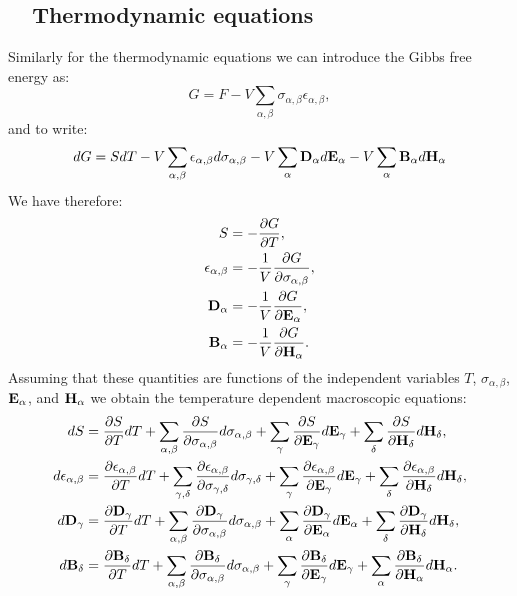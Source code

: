 \documentclass[12pt,a4paper,twoside]{report}
\begin{document}
\subsection{\ \ Thermodynamic equations}
Similarly for the thermodynamic equations we can introduce the Gibbs
free energy as:
\begin{equation}
G=F - V \sum_{\alpha,\beta} \sigma_{\alpha,\beta} \epsilon_{\alpha,\beta},
\end{equation}
and to write:
\begin{equation}
dG=SdT - V \sum_{\alpha,\beta} \epsilon_{\alpha,\beta} d \sigma_{\alpha,\beta}
-V \sum_{\alpha} {\bf D}_\alpha d {\bf E}_\alpha
-V \sum_{\alpha} {\bf B}_\alpha d {\bf H}_\alpha
\end{equation}
We have therefore:
\begin{align}
S&= -{\partial G \over \partial T}, \\
\epsilon_{\alpha,\beta}&= -{1\over V}
{\partial G \over \partial \sigma_{\alpha,\beta}}, \\
{\bf D}_{\alpha}&= -{1\over V}
{\partial G \over \partial {\bf E}_{\alpha}}, \\
{\bf B}_{\alpha}&= -{1\over V}
{\partial G \over \partial {\bf H}_{\alpha}}.
\end{align}
Assuming that these quantities are functions of the independent variables
$T$, $\sigma_{\alpha,\beta}$, ${\bf E}_\alpha$, and ${\bf H}_\alpha$ we
obtain the temperature dependent macroscopic equations:
\begin{align}
dS&= {\partial S \over \partial T} dT+\sum_{\alpha,\beta}
{\partial S \over \partial \sigma_{\alpha,\beta}}d\sigma_{\alpha,\beta}
+\sum_\gamma{\partial S \over \partial {\bf E}_{\gamma}}d{\bf E}_{\gamma}+ 
\sum_\delta{\partial S \over \partial {\bf H}_{\delta}}d{\bf H}_{\delta}, \\
d\epsilon_{\alpha,\beta}&=
{\partial \epsilon_{\alpha,\beta} \over \partial T} dT+\sum_{\gamma,\delta}
{\partial \epsilon_{\alpha,\beta} \over \partial 
\sigma_{\gamma,\delta}}d\sigma_{\gamma,\delta}
+\sum_\gamma{\partial \epsilon_{\alpha,\beta} \over \partial 
{\bf E}_{\gamma}}d{\bf E}_{\gamma}+ 
\sum_\delta{\partial \epsilon_{\alpha,\beta} \over \partial 
{\bf H}_{\delta}}d{\bf H}_{\delta}, \\
d{\bf D}_\gamma&=
{\partial  {\bf D}_\gamma \over \partial T} dT+\sum_{\alpha,\beta}
{\partial {\bf D}_\gamma \over \partial \sigma_{\alpha,\beta}}
d\sigma_{\alpha,\beta}
+\sum_\alpha{\partial {\bf D}_\gamma \over \partial {\bf E}_{\alpha}}d{\bf E}_{\alpha}+ 
\sum_\delta{\partial {\bf D}_\gamma \over \partial {\bf H}_{\delta}}d{\bf H}_{\delta}, \\
d{\bf B}_\delta&=
{\partial {\bf B}_\delta \over \partial T} dT+\sum_{\alpha,\beta}
{\partial {\bf B}_\delta \over \partial \sigma_{\alpha,\beta}}
d\sigma_{\alpha,\beta}
+\sum_\gamma{\partial {\bf B}_\delta \over \partial {\bf E}_{\gamma}}
d{\bf E}_{\gamma}+ 
\sum_\alpha{\partial {\bf B}_\delta \over \partial {\bf H}_{\alpha}}
d{\bf H}_{\alpha}. 
\end{align}
\end{document}
